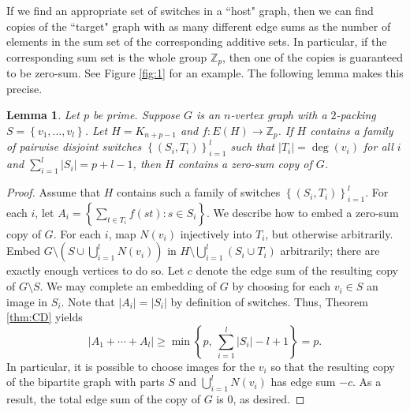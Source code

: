 \documentclass[11pt]{article}
\newcommand{\bZ}{\mathbb{Z}}
\newcommand\set[1]{\left\{ #1 \right\}}
\newcommand\abs[1]{\left\lvert #1 \right\rvert}
\newcommand\pars[1]{\left( #1 \right)}
\theoremstyle{definition}
\theoremstyle{plain}
\newtheorem{lem}{Lemma}
\begin{document}
If we find an appropriate set of switches in a ``host" graph, then we can find copies of the ``target" graph with as many different edge sums as the number of elements in the sum set of the corresponding additive sets. In particular, if the corresponding sum set is the whole group $\bZ_p$, then one of the copies is guaranteed to be zero-sum. See Figure \ref{fig:1} for an example. The following lemma makes this precise.
\begin{lem}
    Let $p$ be prime. Suppose $G$ is an $n$-vertex graph with a $2$-packing $S=\set{v_1,\ldots,v_{l}}$. Let $H=K_{n+p-1}$ and $f:E(H)\to \bZ_p$. If $H$ contains a family of pairwise disjoint switches $\set{(S_i,T_i)}_{i=1}^{l}$ such that $\abs{T_i}=\deg(v_i)$ for all $i$ and $\sum_{i=1}^{l}\abs{S_i}=p+l-1$, then $H$ contains a zero-sum copy of $G$.
    \label{lem:embed}
\end{lem}
\begin{proof}
    Assume that $H$ contains such a family of switches $\set{(S_i,T_i)}_{i=1}^{l}$. For each $i$, let $A_i=\set{\sum_{t\in T_i}f(st):s\in S_i}$. We describe how to embed a zero-sum copy of $G$. For each $i$, map $N(v_i)$ injectively into $T_i$, but otherwise arbitrarily. Embed $G\setminus \pars{S\cup\bigcup_{i=1}^{l}N(v_i)}$ in $H\setminus\bigcup_{i=1}^{l} (S_i\cup T_i)$ arbitrarily; there are exactly enough vertices to do so. Let $c$ denote the edge sum of the resulting copy of $G\setminus S$. We may complete an embedding of $G$ by choosing for each $v_i\in S$ an image in $S_i$. Note that $|A_i|=|S_i|$ by definition of switches. Thus, Theorem \ref{thm:CD} yields
    \begin{equation*}
        \abs{A_1+\cdots + A_l}\geq \min\set{p,\ \sum_{i=1}^{l}\abs{S_i}-l+1}=p.
    \end{equation*}
    In particular, it is possible to choose images for the $v_i$ so that the resulting copy of the bipartite graph with parts $S$ and $\bigcup_{i=1}^lN(v_i)$ has edge sum $-c$. As a result, the total edge sum of the copy of $G$ is $0$, as desired.
\end{proof}
\end{document}

